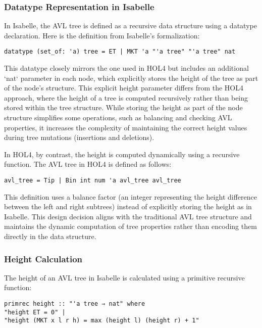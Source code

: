 \documentclass[12pt]{article}
\begin{document}
\subsubsection{Datatype Representation in Isabelle}
In Isabelle, the AVL tree is defined as a recursive data structure using a datatype declaration. Here is the definition from Isabelle’s formalization:

\begin{verbatim}
datatype (set_of: 'a) tree = ET | MKT 'a "'a tree" "'a tree" nat
\end{verbatim}

This datatype closely mirrors the one used in HOL4 but includes an additional `nat` parameter in each node, which explicitly stores the height of the tree as part of the node’s structure. This explicit height parameter differs from the HOL4 approach, where the height of a tree is computed recursively rather than being stored within the tree structure. While storing the height as part of the node structure simplifies some operations, such as balancing and checking AVL properties, it increases the complexity of maintaining the correct height values during tree mutations (insertions and deletions).

In HOL4, by contrast, the height is computed dynamically using a recursive function. The AVL tree in HOL4 is defined as follows:

\begin{verbatim}
avl_tree = Tip | Bin int num 'a avl_tree avl_tree
\end{verbatim}

This definition uses a balance factor (an integer representing the height difference between the left and right subtrees) instead of explicitly storing the height as in Isabelle. This design decision aligns with the traditional AVL tree structure and maintains the dynamic computation of tree properties rather than encoding them directly in the data structure.

\subsubsection{Height Calculation}
The height of an AVL tree in Isabelle is calculated using a primitive recursive function:

\begin{verbatim}
primrec height :: "'a tree ⇒ nat" where
"height ET = 0" |
"height (MKT x l r h) = max (height l) (height r) + 1"
\end{verbatim}
\end{document}
